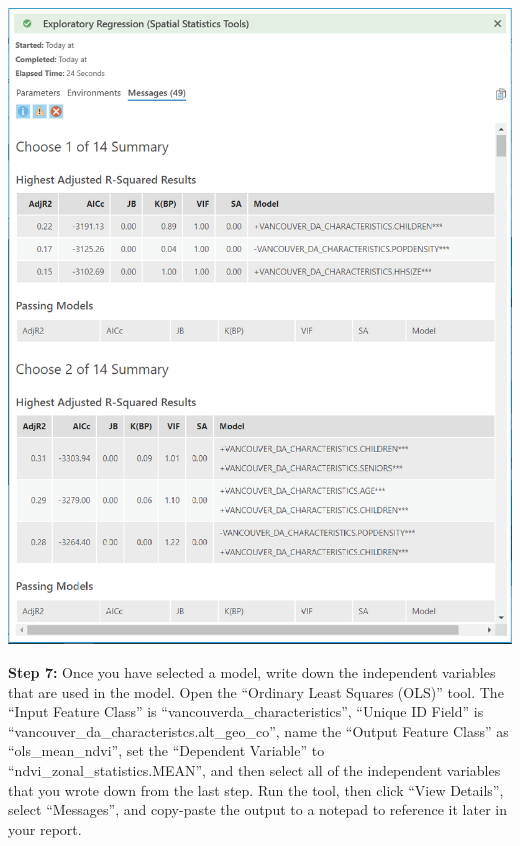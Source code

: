 \documentclass[
]{book}
\begin{document}
\includegraphics[width=0.75\linewidth]{images/05-arcgis-exploratory-regression-results}

\textbf{Step 7:} Once you have selected a model, write down the independent variables that are used in the model. Open the ``Ordinary Least Squares (OLS)'' tool. The ``Input Feature Class'' is ``vancouverda\_characteristics'', ``Unique ID Field'' is ``vancouver\_da\_characteristcs.alt\_geo\_co'', name the ``Output Feature Class'' as ``ols\_mean\_ndvi'', set the ``Dependent Variable'' to ``ndvi\_zonal\_statistics.MEAN'', and then select all of the independent variables that you wrote down from the last step. Run the tool, then click ``View Details'', select ``Messages'', and copy-paste the output to a notepad to reference it later in your report.
\end{document}
